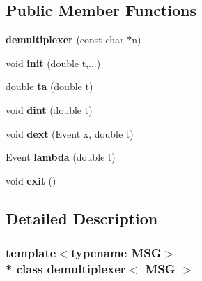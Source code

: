 \subsection*{Public Member Functions}
\begin{DoxyCompactItemize}
\item 
{\bfseries demultiplexer} (const char $\ast$n)\hypertarget{classdemultiplexer_ac0ffa1eb3ce7caac3f20f3908d7d819d}{}\label{classdemultiplexer_ac0ffa1eb3ce7caac3f20f3908d7d819d}

\item 
void {\bfseries init} (double t,...)\hypertarget{classdemultiplexer_ac7c93289875df74e1dfcd2175df19166}{}\label{classdemultiplexer_ac7c93289875df74e1dfcd2175df19166}

\item 
double {\bfseries ta} (double t)\hypertarget{classdemultiplexer_a4c7cc8b523b116010118d564ef8a4d8a}{}\label{classdemultiplexer_a4c7cc8b523b116010118d564ef8a4d8a}

\item 
void {\bfseries dint} (double t)\hypertarget{classdemultiplexer_a4921af7a5202a37af68b1b2197cc3285}{}\label{classdemultiplexer_a4921af7a5202a37af68b1b2197cc3285}

\item 
void {\bfseries dext} (Event x, double t)\hypertarget{classdemultiplexer_aae8739a52134e736f3fab5719518ba74}{}\label{classdemultiplexer_aae8739a52134e736f3fab5719518ba74}

\item 
Event {\bfseries lambda} (double t)\hypertarget{classdemultiplexer_a8fdbd39d23564293c263a42a9513392d}{}\label{classdemultiplexer_a8fdbd39d23564293c263a42a9513392d}

\item 
void {\bfseries exit} ()\hypertarget{classdemultiplexer_a201e20cca9a7d603d3373ca7053e6b7d}{}\label{classdemultiplexer_a201e20cca9a7d603d3373ca7053e6b7d}

\end{DoxyCompactItemize}


\subsection{Detailed Description}
\subsubsection*{template$<$typename M\+SG$>$\\*
class demultiplexer$<$ M\+S\+G $>$}


